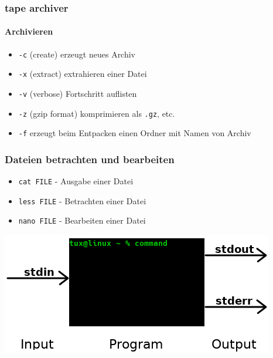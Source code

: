\documentclass[12pt,utf8]{beamer}
\begin{document}
\begin{frame}
\frametitle{\textcolor{FOSSAGalert}{t}ape \textcolor{FOSSAGalert}{ar}chiver}
\framesubtitle{Archivieren}
\begin{itemize}[<+->]
\item {\scriptsize \texttt{-c} (create) erzeugt neues Archiv}
\item {\scriptsize \texttt{-x} (extract) extrahieren einer Datei}
\item {\scriptsize \texttt{-v} (verbose) Fortschritt auflisten}
\item {\scriptsize \texttt{-z} (gzip format) komprimieren als \texttt{.gz}, etc.}
\item {\scriptsize \texttt{-f} erzeugt beim Entpacken einen Ordner mit Namen von Archiv}
\end{itemize}
\end{frame}

\begin{frame}
\frametitle{Dateien betrachten und bearbeiten}
\begin{itemize}
	\item \texttt{cat FILE} - Ausgabe einer Datei
	\item \texttt{less FILE} - Betrachten einer Datei
	\item \texttt{nano FILE} - Bearbeiten einer Datei
\end{itemize}
\end{frame}

\begin{frame}
	\centering\includegraphics[scale=0.65]{res/IOE}
\end{frame}

\begin{frame}
	\Huge\centering{$|$~~~$>$}
\end{frame}

\begin{frame}
\Huge\centering{\&}
\end{frame}
\end{document}

